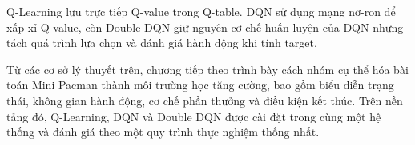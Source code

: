 Q-Learning lưu trực tiếp Q-value trong Q-table. DQN sử dụng mạng nơ-ron để xấp xỉ Q-value, còn Double DQN giữ nguyên cơ chế huấn luyện của DQN nhưng tách quá trình lựa chọn và đánh giá hành động khi tính target.

Từ các cơ sở lý thuyết trên, chương tiếp theo trình bày cách nhóm cụ thể hóa bài toán Mini Pacman thành môi trường học tăng cường, bao gồm biểu diễn trạng thái, không gian hành động, cơ chế phần thưởng và điều kiện kết thúc. Trên nền tảng đó, Q-Learning, DQN và Double DQN được cài đặt trong cùng một hệ thống và đánh giá theo một quy trình thực nghiệm thống nhất.
